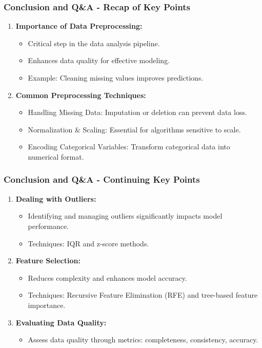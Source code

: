 \documentclass{beamer}
\begin{document}
\begin{frame}[fragile]
    \frametitle{Conclusion and Q\&A - Recap of Key Points}
    \begin{enumerate}
        \item \textbf{Importance of Data Preprocessing:}
        \begin{itemize}
            \item Critical step in the data analysis pipeline.
            \item Enhances data quality for effective modeling.
            \item Example: Cleaning missing values improves predictions.
        \end{itemize}
        
        \item \textbf{Common Preprocessing Techniques:}
        \begin{itemize}
            \item Handling Missing Data: Imputation or deletion can prevent data loss.
            \item Normalization \& Scaling: Essential for algorithms sensitive to scale.
            \item Encoding Categorical Variables: Transform categorical data into numerical format.
        \end{itemize}
    \end{enumerate}
\end{frame}

\begin{frame}[fragile]
    \frametitle{Conclusion and Q\&A - Continuing Key Points}
    \begin{enumerate}[resume]
        \item \textbf{Dealing with Outliers:}
        \begin{itemize}
            \item Identifying and managing outliers significantly impacts model performance.
            \item Techniques: IQR and z-score methods.
        \end{itemize}

        \item \textbf{Feature Selection:}
        \begin{itemize}
            \item Reduces complexity and enhances model accuracy.
            \item Techniques: Recursive Feature Elimination (RFE) and tree-based feature importance.
        \end{itemize}

        \item \textbf{Evaluating Data Quality:}
        \begin{itemize}
            \item Assess data quality through metrics: completeness, consistency, accuracy.
        \end{itemize}
    \end{enumerate}
\end{frame}
\end{document}
